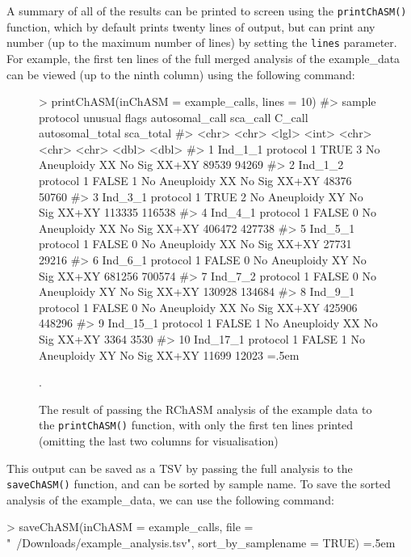 \documentclass[10pt,a4paper]{article}
\newenvironment{cverbatim1}
 {\SaveVerbatim{cverb}}
 {\endSaveVerbatim
    \relsize{-1}\fboxrule=0pt\fboxsep=.5em
  \colorbox{cverbbg}{\BUseVerbatim{cverb}}%
}
\begin{document}
A summary of all of the results can be printed to screen using the \texttt{printChASM()} function, which by default prints twenty lines of output, but can print any number (up to the maximum number of lines) by setting the \texttt{lines} parameter. For example, the first ten lines of the full merged analysis of the example\_data can be viewed (up to the ninth column) using the following command:

\begin{figure}[H]
\centering 
\begin{cverbatim1}
> printChASM(inChASM = example_calls, lines = 10)
#>    sample   protocol   unusual flags autosomal_call sca_call C_call       autosomal_total sca_total
#>    <chr>    <chr>      <lgl>   <int> <chr>          <chr>    <chr>                  <dbl>     <dbl>
#>  1 Ind_1_1  protocol 1 TRUE        3 No Aneuploidy  XX       No Sig XX+XY           89539     94269
#>  2 Ind_1_2  protocol 1 FALSE       1 No Aneuploidy  XX       No Sig XX+XY           48376     50760
#>  3 Ind_3_1  protocol 1 TRUE        2 No Aneuploidy  XY       No Sig XX+XY          113335    116538
#>  4 Ind_4_1  protocol 1 FALSE       0 No Aneuploidy  XX       No Sig XX+XY          406472    427738
#>  5 Ind_5_1  protocol 1 FALSE       0 No Aneuploidy  XX       No Sig XX+XY           27731     29216
#>  6 Ind_6_1  protocol 1 FALSE       0 No Aneuploidy  XY       No Sig XX+XY          681256    700574
#>  7 Ind_7_2  protocol 1 FALSE       0 No Aneuploidy  XY       No Sig XX+XY          130928    134684
#>  8 Ind_9_1  protocol 1 FALSE       0 No Aneuploidy  XX       No Sig XX+XY          425906    448296
#>  9 Ind_15_1 protocol 1 FALSE       1 No Aneuploidy  XX       No Sig XX+XY            3364      3530
#> 10 Ind_17_1 protocol 1 FALSE       1 No Aneuploidy  XY       No Sig XX+XY           11699     12023
\end{cverbatim1}
\caption{The result of passing the RChASM analysis of the example data to the \texttt{printChASM()} function, with only the first ten lines printed (omitting the last two columns for visualisation)}.
\label{fig:printChasmOutput}
\end{figure}

This output can be saved as a TSV by passing the full analysis to the \texttt{saveChASM()} function, and can be sorted by sample name. To save the sorted analysis of the example\_data, we can use the following command:

\begin{cverbatim1}
> saveChASM(inChASM = example_calls, 
            file = "~/Downloads/example_analysis.tsv", 
            sort_by_samplename = TRUE)
\end{cverbatim1}
\end{document}
